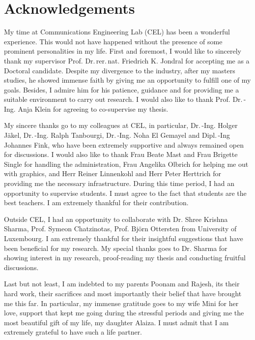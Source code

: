 \chapter*{Acknowledgements}

My time at Communications Engineering Lab (CEL) has been a wonderful experience. This would not have happened without the presence of some prominent personalities in my life. First and foremost, I would like to sincerely thank my supervisor Prof. Dr.\,rer.\,nat. Friedrich K. Jondral for accepting me as a Doctoral candidate. %
Despite my divergence to the industry, after my masters studies, he showed immense faith by giving me an opportunity to fulfill one of my goals. 
Besides, I admire him for his patience, guidance and for providing me a suitable environment to carry out research. I would also like to thank Prof. Dr.\,-Ing. Anja Klein for agreeing to co-supervise my thesis.

My sincere thanks go to my colleagues at CEL, in particular, Dr.\,-Ing. Holger J\"akel, Dr.\,-Ing. Ralph Tanbourgi, Dr.\,-Ing. Noha El Gemayel and Dipl.\,-Ing Johannes Fink, who have been extremely supportive and always remained open for discussions. I would also like to thank Frau Beate Mast and Frau Brigette Single for handling the administration, Frau Angelika Olbrich for helping me out with graphics, and Herr Reiner Linnenkohl and Herr Peter Herttrich for providing me the necessary infrastructure. During this time period, I had an opportunity to supervise students. I must agree to the fact that students are the best teachers. I am extremely thankful for their contribution. 

Outside CEL, I had an opportunity to collaborate with Dr. Shree Krishna Sharma, Prof. Symeon Chatzinotas, Prof. Bj\"orn Ottersten from University of Luxembourg. I am extremely thankful for their insightful suggestions that have been beneficial for my research. My special thanks goes to Dr. Sharma for showing interest in my research, proof-reading my thesis and conducting fruitful discussions. 

Last but not least, I am indebted to my parents Poonam and Rajesh, its their hard work, their sacrifices and most importantly their belief that have brought me this far. In particular, my immense gratitude goes to my wife Mini for her love, support that kept me going during the stressful periods and giving me the most beautiful gift of my life, my daughter Alaiza. I must admit that I am extremely grateful to have such a life partner. 
